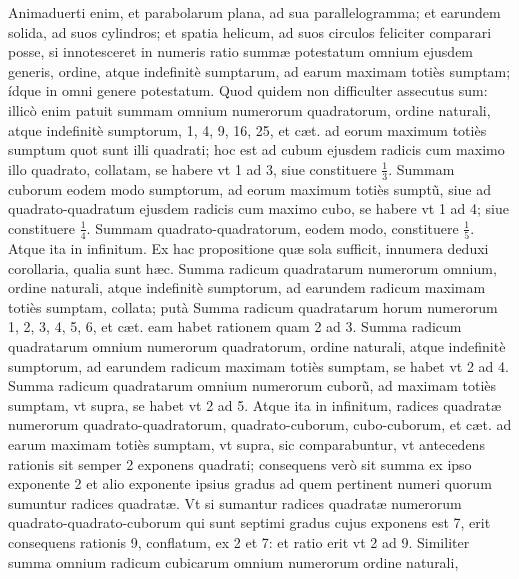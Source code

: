 \documentclass[11pt,a4paper]{article}
\begin{document}
Animaduerti enim, et parabolarum plana, ad sua parallelogramma; et earundem solida, ad suos cylindros; et spatia helicum, ad suos circulos feliciter comparari posse, si innotesceret in numeris ratio summæ potestatum omnium ejusdem generis, ordine, atque indefinitè sumptarum, ad earum maximam totiès sumptam; ídque in omni genere potestatum. Quod quidem non difficulter assecutus sum: illicò enim patuit summam omnium numerorum quadratorum, ordine naturali, atque indefinitè sumptorum, 1, 4, 9, 16, 25, et cæt. ad eorum maximum totiès sumptum quot sunt illi quadrati; hoc est ad cubum ejusdem radicis cum maximo illo quadrato, collatam, se habere vt 1 ad 3, siue constituere $\frac13$. Summam cuborum eodem modo sumptorum, ad eorum maximum totiès sumptũ, siue ad quadrato-quadratum ejusdem radicis cum maximo cubo, se habere vt 1 ad 4; siue constituere $\frac14$. Summam quadrato-quadratorum, eodem modo, constituere $\frac15$. Atque ita in infinitum. Ex hac propositione quæ sola sufficit, innumera deduxi corollaria, qualia sunt hæc. Summa radicum quadratarum numerorum omnium, ordine naturali, atque indefinitè sumptorum, ad earundem radicum maximam totiès sumptam, collata; putà Summa radicum quadratarum horum numerorum 1, 2, 3, 4, 5, 6, et cæt. eam habet rationem quam 2 ad 3. Summa radicum quadratarum omnium numerorum quadratorum, ordine naturali, atque indefinitè sumptorum, ad earundem radicum maximam totiès sumptam, se habet vt 2 ad 4. Summa radicum quadratarum omnium numerorum cuborũ, ad maximam totiès sumptam, vt supra, se habet vt 2 ad 5. Atque ita in infinitum, radices quadratæ numerorum quadrato-quadratorum, quadrato-cuborum, cubo-cuborum, et cæt. ad earum maximam totiès sumptam, vt supra, sic comparabuntur, vt antecedens rationis sit semper 2 exponens quadrati; consequens verò sit summa ex ipso exponente 2 et alio exponente ipsius gradus ad quem pertinent numeri quorum sumuntur radices quadratæ. Vt si sumantur radices quadratæ numerorum quadrato-quadrato-cuborum qui sunt septimi gradus cujus exponens est 7, erit consequens rationis 9, conflatum, ex 2 et 7: et ratio erit vt 2 ad 9. Similiter summa omnium radicum cubicarum omnium numerorum ordine naturali,

\end{document}
